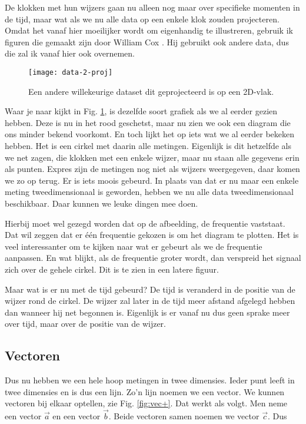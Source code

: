 \documentclass[11pt,fleqn]{book} %
\begin{document}
De klokken met hun wijzers gaan nu alleen nog maar over specifieke momenten in de tijd, maar wat als we nu alle data op een enkele klok zouden projecteren. Omdat het vanaf hier moeilijker wordt om eigenhandig te illustreren, gebruik ik figuren die gemaakt zijn door William Cox \cite{cox}. Hij gebruikt ook andere data, dus die zal ik vanaf hier ook overnemen.

\begin{figure}[h]
	\centering\texttt{[image: data-2-proj]}
	\caption{Een andere willekeurige dataset dit geprojecteerd is op een 2D-vlak.}
	\label{fig:data-2-proj}
\end{figure}

Waar je naar kijkt in Fig. \ref{fig:data-2-proj}, is dezelfde soort grafiek als we al eerder gezien hebben. Deze is nu in het rood geschetst, maar nu zien we ook een diagram die ons minder bekend voorkomt. En toch lijkt het op iets wat we al eerder bekeken hebben. Het is een cirkel met daarin alle metingen. Eigenlijk is dit hetzelfde als we net zagen, die klokken met een enkele wijzer, maar nu staan alle gegevens erin als punten. Expres zijn de metingen nog niet als wijzers weergegeven, daar komen we zo op terug. Er is iets moois gebeurd. In plaats van dat er nu maar een enkele meting tweedimensionaal is geworden, hebben we nu alle data tweedimensionaal beschikbaar. Daar kunnen we leuke dingen mee doen.

Hierbij moet wel gezegd worden dat op de afbeelding, de frequentie vaststaat. Dat wil zeggen dat er één frequentie gekozen is om het diagram te plotten. Het is veel interessanter om te kijken naar wat er gebeurt als we de frequentie aanpassen. En wat blijkt, als de frequentie groter wordt, dan verspreid het signaal zich over de gehele cirkel. Dit is te zien in een latere figuur.

Maar wat is er nu met de tijd gebeurd? De tijd is veranderd in de positie van de wijzer rond de cirkel. De wijzer zal later in de tijd meer afstand afgelegd hebben dan wanneer hij net begonnen is. Eigenlijk is er vanaf nu dus geen sprake meer over tijd, maar over de positie van de wijzer.

\subsection{Vectoren}
Dus nu hebben we een hele hoop metingen in twee dimensies. Ieder punt leeft in twee dimensies en is dus een lijn. Zo'n lijn noemen we een vector. We kunnen vectoren bij elkaar optellen, zie Fig. \ref{fig:vec+}. Dat werkt als volgt. Men neme een vector $\vec{a}$ en een vector $\vec{b}$. Beide vectoren samen noemen we vector $\vec{c}$. Dus
\end{document}
